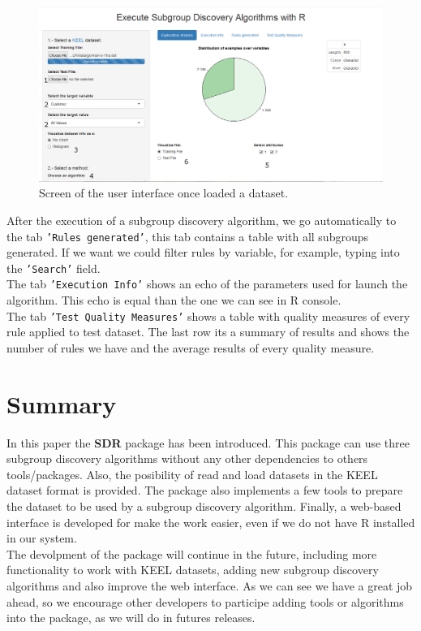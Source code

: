 \documentclass[]{article}
\begin{document}
\begin{figure}[hbtp]
  \centering
  \includegraphics[width=0.8\linewidth]{Interfaz2.png}
  \caption{Screen of the user interface once loaded a dataset.}
  \label{pantalla2}
\end{figure}

After the execution of a subgroup discovery algorithm, we go
automatically to the tab \texttt{'Rules generated'}, this tab contains a
table with all subgroups generated. If we want we could filter rules by
variable, for example, typing into the \texttt{'Search'} field.\\The tab
\texttt{'Execution Info'} shows an echo of the parameters used for
launch the algorithm. This echo is equal than the one we can see in R
console.\\The tab \texttt{'Test Quality Measures'} shows a table with
quality measures of every rule applied to test dataset. The last row its
a summary of results and shows the number of rules we have and the
average results of every quality measure.

\section{Summary}\label{summary}

In this paper the \textbf{SDR} package has been introduced. This package
can use three subgroup discovery algorithms without any other
dependencies to others tools/packages. Also, the posibility of read and
load datasets in the KEEL dataset format is provided. The package also
implements a few tools to prepare the dataset to be used by a subgroup
discovery algorithm. Finally, a web-based interface is developed for
make the work easier, even if we do not have R installed in our
system.\\The devolpment of the package will continue in the future,
including more functionality to work with KEEL datasets, adding new
subgroup discovery algorithms and also improve the web interface. As we
can see we have a great job ahead, so we encourage other developers to
participe adding tools or algorithms into the package, as we will do in
futures releases.
\end{document}
